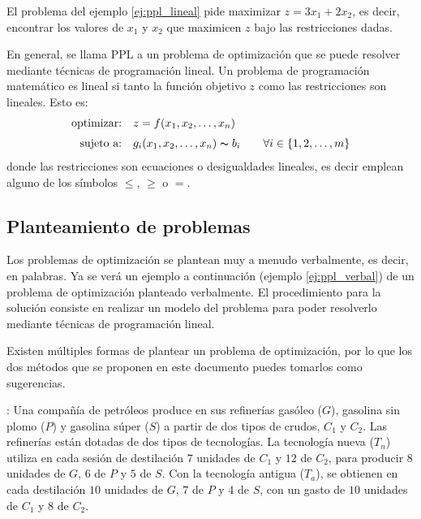 El problema del ejemplo \ref{ej:ppl_lineal} pide maximizar \(z = 3x_1 + 2x_2\), es decir, encontrar los valores de \(x_1\) y \(x_2\) que maximicen \(z\) bajo las restricciones dadas.

En general, se llama PPL a un problema de optimización que se puede resolver mediante técnicas de programación lineal. Un problema de programación matemático es lineal si tanto la función objetivo \(z\) como las restricciones son lineales. Esto es:
\begin{align*}
  \text{optimizar:} \quad         &z = f(x_1, x_2, \ldots, x_n) \\[3pt]
  \text{sujeto a:} \quad    &g_i(x_1, x_2, \ldots, x_n) \thicksim  b_i \qquad \forall i \in \{1, 2, \ldots, m\} \\
\end{align*}
donde las restricciones son ecuaciones o desigualdades lineales, es decir emplean alguno de los símbolos \(\leq\), \(\geq\) o \(=\).

\subsection{Planteamiento de problemas}

Los problemas de optimización se plantean muy a menudo verbalmente, es decir, en palabras. Ya se verá un ejemplo a continuación (ejemplo \ref{ej:ppl_verbal}) de un problema de optimización planteado verbalmente. El procedimiento para la solución consiste en realizar un modelo del problema para poder resolverlo mediante técnicas de programación lineal.

\begin{tcolorbox}[interesting_data, title=¿Existe solo una forma de plantear problemas?]
  Existen múltiples formas de plantear un problema de optimización, por lo que los dos métodos que se proponen en este documento puedes tomarlos como sugerencias.
\end{tcolorbox}

\ejemplo\label{ej:ppl_verbal}: Una compañía de petróleos produce en sus refinerías gasóleo (\(G\)), gasolina sin plomo (\(P\)) y gasolina súper (\(S\)) a partir de dos tipos de crudos, \(C_1\) y \(C_2\). Las refinerías están dotadas de dos tipos de tecnologías. La tecnología nueva (\(T_n\)) utiliza en cada sesión de destilación \(7\) unidades de \(C_1\) y \(12\) de \(C_2\), para producir \(8\) unidades de \(G\), \(6\) de \(P\) y \(5\) de \(S\). Con la tecnología antigua (\(T_a\)), se obtienen en cada destilación \(10\) unidades de \(G\), \(7\) de \(P\) y \(4\) de \(S\), con un gasto de \(10\) unidades de \(C_1\) y \(8\) de \(C_2\).


